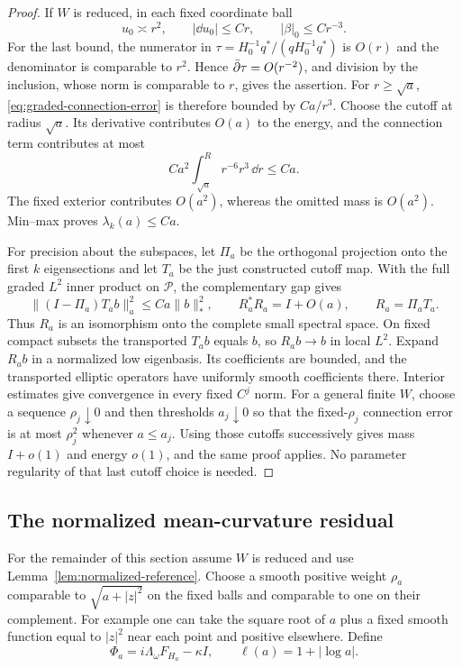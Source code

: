 \begin{proof}
If \(W\) is reduced, in each fixed coordinate ball
\[
 u_0\asymp r^2,\qquad |\dd u_0|\le Cr,\qquad
 |\beta|_0\le Cr^{-3}.
\]
For the last bound, the numerator in
\(\tau=H_0^{-1}q^*/(qH_0^{-1}q^*)\) is \(O(r)\) and the
denominator is comparable to \(r^2\). Hence
\(\bar\partial\tau=O(r^{-2})\), and division by the inclusion,
whose norm is comparable to \(r\), gives the assertion.
For \(r\ge\sqrt a\), \eqref{eq:graded-connection-error} is
therefore bounded by \(Ca/r^3\). Choose the cutoff at radius
\(\sqrt a\). Its derivative contributes \(O(a)\) to the energy,
and the connection term contributes at most
\[
 Ca^2\int_{\sqrt a}^{R}r^{-6}r^3\,\dd r\le Ca.
\]
The fixed exterior contributes \(O(a^2)\), whereas the omitted
mass is \(O(a^2)\). Min--max proves \(\lambda_k(a)\le Ca\).

For precision about the subspaces, let \(\Pi_a\) be the orthogonal
projection onto the first \(k\) eigensections and let \(T_a\)
be the just constructed cutoff map. With the full graded
\(L^2\) inner product on \(\mathcal P\), the complementary gap gives
\begin{equation}\label{eq:spectral-identification}
 \|(I-\Pi_a)T_ab\|_a^2\le Ca\|b\|_*^2,\qquad
 R_a^*R_a=I+O(a),\qquad R_a=\Pi_aT_a.
\end{equation}
Thus \(R_a\) is an isomorphism onto the complete small spectral
space. On fixed compact subsets the transported \(T_ab\) equals
\(b\), so \(R_ab\to b\) in local \(L^2\). Expand \(R_ab\) in a
normalized low eigenbasis. Its coefficients are bounded, and the
transported elliptic operators have uniformly smooth coefficients
there. Interior estimates give convergence in every fixed
\(C^j\) norm. For a general finite \(W\), choose a sequence
\(\rho_j\downarrow0\) and then thresholds \(a_j\downarrow0\)
so that the fixed-\(\rho_j\) connection error is at most
\(\rho_j^2\) whenever \(a\le a_j\). Using those cutoffs successively
gives mass \(I+o(1)\) and energy \(o(1)\), and the same proof
applies. No parameter regularity of that last cutoff choice is needed.
\end{proof}

\subsection{The normalized mean-curvature residual}

For the remainder of this section assume \(W\) is reduced and use
Lemma~\ref{lem:normalized-reference}. Choose a smooth positive weight
\(\rho_a\) comparable to \(\sqrt{a+|z|^2}\) on the fixed balls and
comparable to one on their complement. For example one can take the
square root of \(a\) plus a fixed smooth function equal to \(|z|^2\)
near each point and positive elsewhere. Define
\[
 \Phi_a=i\Lambda_\omega F_{H_a}-\kappa I,\qquad
 \ell(a)=1+|\log a|.
\]

